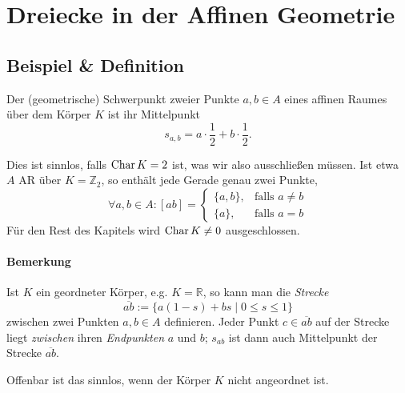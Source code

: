 \section{Dreiecke in der Affinen Geometrie}
\subsection{Beispiel \& Definition}
	\begin{Definition}[Mittelpunkt]
	Der (geometrische) Schwerpunkt zweier Punkte $ a,b\in A $ eines affinen Raumes über dem Körper $ K $ ist ihr Mittelpunkt
		\[ s_{a,b} = a\cdot \frac{1}{2}+b\cdot \frac{1}{2}. \]
	\end{Definition}
	
	Dies ist sinnlos, falls $ \operatorname{Char} K = 2 $ ist, was wir also ausschließen müssen.
	Ist etwa $ A $ AR über $ K=\mathbb{Z}_2 $, so enthält jede Gerade genau zwei Punkte,
		\[ \forall a,b\in A: [ab] = 
			\begin{cases}
				\{a,b\},& \text{falls }a\neq b\\
				\{a\},& \text{falls } a=b
			\end{cases} \]
	Für den Rest des Kapitels wird $ \operatorname{Char} K \neq 0 $ ausgeschlossen.
\paragraph{Bemerkung}
	Ist $ K $ ein geordneter Körper, e.g. $ K=\mathbb{R} $, so kann man die \emph{Strecke}
		\[ \overline{ab}:= \{a(1-s)+bs\mid 0\leq s\leq 1\} \]
	zwischen zwei Punkten $ a,b\in A $ definieren. Jeder Punkt $ c\in \overline{ab} $ auf der Strecke liegt \emph{zwischen} ihren \emph{Endpunkten} $ a $ und $ b $; $ s_{ab} $ ist dann auch Mittelpunkt der Strecke $ \overline{ab} $.
	
	Offenbar ist das sinnlos, wenn der Körper $ K $ nicht angeordnet ist.
	
	

